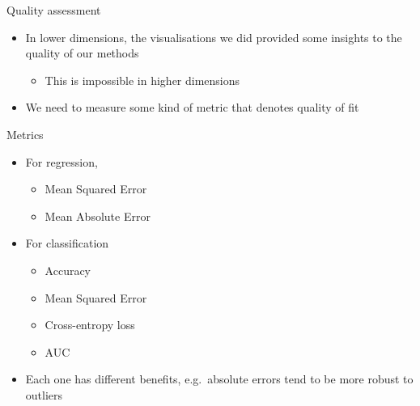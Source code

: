 \documentclass[obeyspaces,aspectratio=43]{beamer}
\providecommand{\tightlist}{%
  \setlength{\itemsep}{0pt}\setlength{\parskip}{0pt}}
\begin{document}
\begin{frame}{Quality assessment}

\begin{itemize}
\tightlist
\item
  In lower dimensions, the visualisations we did provided some insights
  to the quality of our methods

  \begin{itemize}
  \tightlist
  \item
    This is impossible in higher dimensions
  \end{itemize}
\item
  We need to measure some kind of metric that denotes quality of fit
\end{itemize}

\end{frame}

\begin{frame}{Metrics}

\begin{itemize}
\tightlist
\item
  For regression,

  \begin{itemize}
  \tightlist
  \item
    Mean Squared Error
  \item
    Mean Absolute Error
  \end{itemize}
\item
  For classification

  \begin{itemize}
  \tightlist
  \item
    Accuracy
  \item
    Mean Squared Error
  \item
    Cross-entropy loss
  \item
    AUC
  \end{itemize}
\item
  Each one has different benefits, e.g.~absolute errors tend to be more
  robust to outliers
\end{itemize}

\end{frame}
\end{document}
